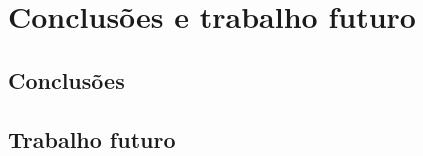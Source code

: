 \chapter{Conclusões e trabalho futuro}
\label{chapter7}

\section{Conclusões}
\label{conclusions}

\section{Trabalho futuro}
\label{future}

\cleardoublepage